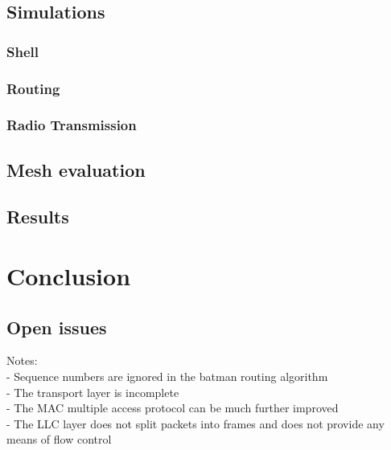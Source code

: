 \section{Simulations}
\subsection{Shell}
\subsection{Routing}
\subsection{Radio Transmission}
\section{Mesh evaluation}
\section{Results}

\chapter{Conclusion}
\section{Open issues}
Notes:\\
- Sequence numbers are ignored in the batman routing algorithm \\
- The transport layer is incomplete \\
- The MAC multiple access protocol can be much further improved\\
- The LLC layer does not split packets into frames and does not provide any means of flow control\\

